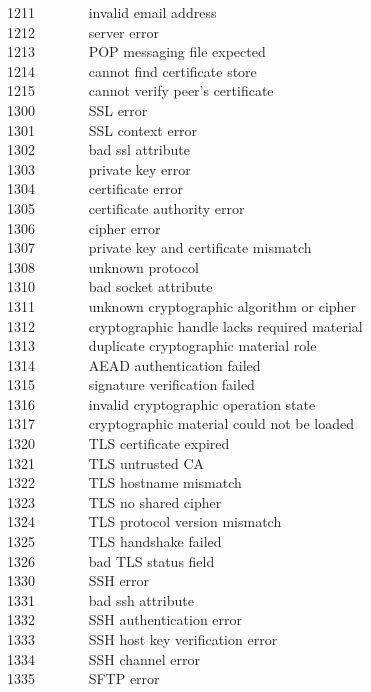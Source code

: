 1211 \ \ \ \ \ \ \ invalid email address\\
1212 \ \ \ \ \ \ \ server error\\
1213 \ \ \ \ \ \ \ POP messaging file expected\\
1214 \ \ \ \ \ \ \ cannot find certificate store\\
1215 \ \ \ \ \ \ \ cannot verify peer's certificate\\
1300 \ \ \ \ \ \ \ SSL error\\
1301 \ \ \ \ \ \ \ SSL context error\\
1302 \ \ \ \ \ \ \ bad ssl attribute\\
1303 \ \ \ \ \ \ \ private key error\\
1304 \ \ \ \ \ \ \ certificate error\\
1305 \ \ \ \ \ \ \ certificate authority error\\
1306 \ \ \ \ \ \ \ cipher error\\
1307 \ \ \ \ \ \ \ private key and certificate mismatch\\
1308 \ \ \ \ \ \ \ unknown protocol\\
1310 \ \ \ \ \ \ \ bad socket attribute\\
1311 \ \ \ \ \ \ \ unknown cryptographic algorithm or cipher\\
1312 \ \ \ \ \ \ \ cryptographic handle lacks required material\\
1313 \ \ \ \ \ \ \ duplicate cryptographic material role\\
1314 \ \ \ \ \ \ \ AEAD authentication failed\\
1315 \ \ \ \ \ \ \ signature verification failed\\
1316 \ \ \ \ \ \ \ invalid cryptographic operation state\\
1317 \ \ \ \ \ \ \ cryptographic material could not be loaded\\
1320 \ \ \ \ \ \ \ TLS certificate expired\\
1321 \ \ \ \ \ \ \ TLS untrusted CA\\
1322 \ \ \ \ \ \ \ TLS hostname mismatch\\
1323 \ \ \ \ \ \ \ TLS no shared cipher\\
1324 \ \ \ \ \ \ \ TLS protocol version mismatch\\
1325 \ \ \ \ \ \ \ TLS handshake failed\\
1326 \ \ \ \ \ \ \ bad TLS status field\\
1330 \ \ \ \ \ \ \ SSH error\\
1331 \ \ \ \ \ \ \ bad ssh attribute\\
1332 \ \ \ \ \ \ \ SSH authentication error\\
1333 \ \ \ \ \ \ \ SSH host key verification error\\
1334 \ \ \ \ \ \ \ SSH channel error\\
1335 \ \ \ \ \ \ \ SFTP error\\


